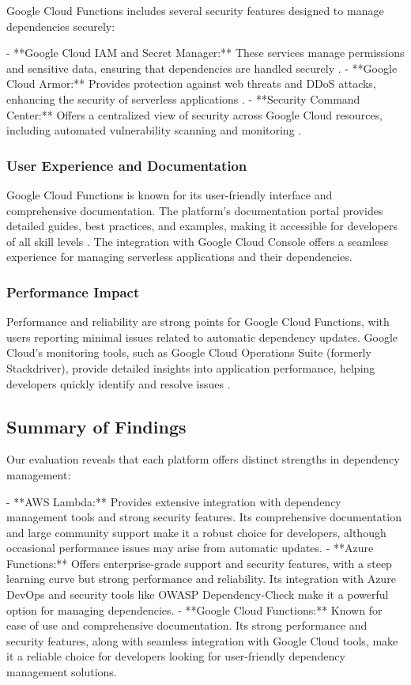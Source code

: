 \documentclass[sigconf]{acmart}
\begin{document}
Google Cloud Functions includes several security features designed to manage dependencies securely:

- **Google Cloud IAM and Secret Manager:** These services manage permissions and sensitive data, ensuring that dependencies are handled securely \cite{googleSecurity2023}.
- **Google Cloud Armor:** Provides protection against web threats and DDoS attacks, enhancing the security of serverless applications \cite{googleArmor2023}.
- **Security Command Center:** Offers a centralized view of security across Google Cloud resources, including automated vulnerability scanning and monitoring \cite{googleSCC2023}.

\subsubsection{User Experience and Documentation}

Google Cloud Functions is known for its user-friendly interface and comprehensive documentation. The platform's documentation portal provides detailed guides, best practices, and examples, making it accessible for developers of all skill levels \cite{googleDocs2023}. The integration with Google Cloud Console offers a seamless experience for managing serverless applications and their dependencies.

\subsubsection{Performance Impact}

Performance and reliability are strong points for Google Cloud Functions, with users reporting minimal issues related to automatic dependency updates. Google Cloud's monitoring tools, such as Google Cloud Operations Suite (formerly Stackdriver), provide detailed insights into application performance, helping developers quickly identify and resolve issues \cite{googlePerformance2023}.

\subsection{Summary of Findings}

Our evaluation reveals that each platform offers distinct strengths in dependency management:

- **AWS Lambda:** Provides extensive integration with dependency management tools and strong security features. Its comprehensive documentation and large community support make it a robust choice for developers, although occasional performance issues may arise from automatic updates.
- **Azure Functions:** Offers enterprise-grade support and security features, with a steep learning curve but strong performance and reliability. Its integration with Azure DevOps and security tools like OWASP Dependency-Check make it a powerful option for managing dependencies.
- **Google Cloud Functions:** Known for ease of use and comprehensive documentation. Its strong performance and security features, along with seamless integration with Google Cloud tools, make it a reliable choice for developers looking for user-friendly dependency management solutions.
\end{document}
